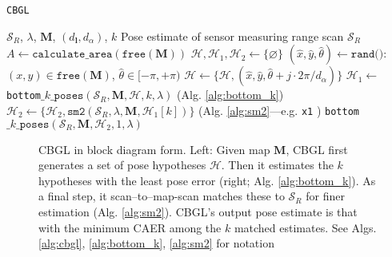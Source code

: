 \begin{algorithm}[]
  \caption{\texttt{CBGL}}
  \begin{spacing}{1.0}
  \begin{algorithmic}[1]
    \REQUIRE $\mathcal{S}_R$, $\lambda$, $\bm{M}$, $(d_{\bm{l}}, d_\alpha)$, $k$
    \ENSURE Pose estimate of sensor measuring range scan $\mathcal{S}_R$ %
    \STATE $A \leftarrow \texttt{calculate\_area}(\texttt{free}(\bm{M}))$
    \STATE $\mathcal{H}, \mathcal{H}_1, \mathcal{H}_2 \leftarrow \{\varnothing\}$
      \STATE \small $(\hat{x},\hat{y},\hat{\theta}) \leftarrow \texttt{rand()}$: $(x,y) \in \texttt{free}(\bm{M})$, $\hat{\theta} \in [-\pi,+\pi)$
        \STATE $\mathcal{H} \leftarrow \{\mathcal{H}, (\hat{x}, \hat{y}, \hat{\theta} + j \cdot 2\pi / d_{\alpha})\}$     \label{alg:cbgl:h}
      \ENDFOR
    \ENDFOR
    \STATE $\mathcal{H}_1 \leftarrow$ \texttt{bottom}$\_k\_\texttt{poses}(\mathcal{S}_R, \bm{M}, \mathcal{H}, k, \lambda)$ \hfill {\small (Alg. \ref{alg:bottom_k}}) \label{alg:cbgl:h1}
      \STATE \footnotesize $\mathcal{H}_2 \leftarrow \{\mathcal{H}_2, \texttt{sm2}(\mathcal{S}_R, \lambda, \bm{M}, \mathcal{H}_1[k])\}$ \hfill {(Alg. \ref{alg:sm2}---e.g. \texttt{x1} \cite{Filotheou2023a})}\label{alg:cbgl:h2}
    \ENDFOR
    \RETURN \texttt{bottom}$\_k\_\texttt{poses}(\mathcal{S}_R, \bm{M}, \mathcal{H}_2, 1, \lambda)$
  \end{algorithmic}
  \end{spacing}
  \label{alg:cbgl}
\end{algorithm}




\begin{figure}\vspace{-0.4cm}
  \subfloat{\label{fig:cbgl}     }
  \subfloat{\label{fig:bottom_k} }
  \caption{\small CBGL in block diagram form. Left: Given map $\bm{M}$, CBGL
           first generates a set of pose hypotheses $\mathcal{H}$. Then it
           estimates the $k$ hypotheses with the least pose error (right; Alg.
           \ref{alg:bottom_k}).
           As a final step, it scan--to--map-scan
           matches these to $\mathcal{S}_R$ for finer estimation
           (Alg. \ref{alg:sm2}).
           CBGL's output pose estimate is that with
           the minimum CAER among the $k$ matched estimates. See Algs.
           \ref{alg:cbgl}, \ref{alg:bottom_k}, \ref{alg:sm2} for notation
           }
  \label{fig:block_system}
\end{figure}





